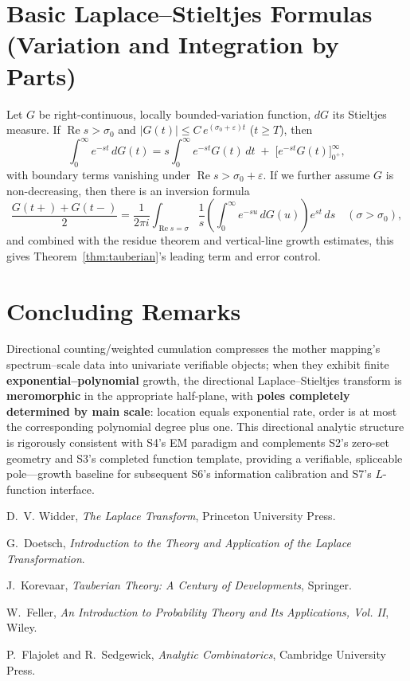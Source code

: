\documentclass[11pt,a4paper]{article}
\theoremstyle{remark}
\DeclareMathOperator{\Re}{Re}
\begin{document}
\section{Basic Laplace--Stieltjes Formulas (Variation and Integration by Parts)}

Let $G$ be right-continuous, locally bounded-variation function, $dG$ its Stieltjes measure. If $\Re s>\sigma_0$ and $|G(t)|\le C\,e^{(\sigma_0+\varepsilon)t}$ ($t\ge T$), then
\begin{equation}
\int_0^\infty e^{-s t}\,dG(t)
=s\int_0^\infty e^{-s t}G(t)\,dt\; +\;\big[e^{-s t}G(t)\big]_{0^+}^{\infty},
\end{equation}
with boundary terms vanishing under $\Re s>\sigma_0+\varepsilon$. If we further assume $G$ is non-decreasing, then there is an inversion formula
\begin{equation}
\frac{G(t+)+G(t-)}{2}
=\frac{1}{2\pi i}\int_{\Re s=\sigma}\frac{1}{s}\left(\int_0^\infty e^{-s u}\,dG(u)\right)e^{s t}\,ds
\quad (\sigma>\sigma_0),
\end{equation}
and combined with the residue theorem and vertical-line growth estimates, this gives Theorem~\ref{thm:tauberian}'s leading term and error control.

\section*{Concluding Remarks}

Directional counting/weighted cumulation compresses the mother mapping's spectrum--scale data into univariate verifiable objects; when they exhibit finite \textbf{exponential--polynomial} growth, the directional Laplace--Stieltjes transform is \textbf{meromorphic} in the appropriate half-plane, with \textbf{poles completely determined by main scale}: location equals exponential rate, order is at most the corresponding polynomial degree plus one. This directional analytic structure is rigorously consistent with S4's EM paradigm and complements S2's zero-set geometry and S3's completed function template, providing a verifiable, spliceable pole---growth baseline for subsequent S6's information calibration and S7's $L$-function interface.

\begin{thebibliography}{9}

D.~V. Widder, \emph{The Laplace Transform}, Princeton University Press.

G.~Doetsch, \emph{Introduction to the Theory and Application of the Laplace Transformation}.

J.~Korevaar, \emph{Tauberian Theory: A Century of Developments}, Springer.

W.~Feller, \emph{An Introduction to Probability Theory and Its Applications, Vol. II}, Wiley.

P.~Flajolet and R.~Sedgewick, \emph{Analytic Combinatorics}, Cambridge University Press.

\end{thebibliography}
\end{document}
